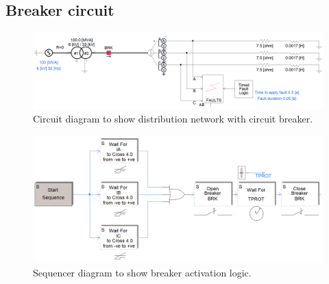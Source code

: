 \subsection{Breaker circuit}
\begin{figure}[H]
    \centering
    \includegraphics[width = \textwidth]{img/figure15.png}
    \caption{Circuit diagram to show distribution network with circuit breaker.}
    \label{fig:breakerNetwork}
\end{figure}
\begin{figure}[H]
    \centering
    \includegraphics[width = \textwidth]{img/figure16.png}
    \caption{Sequencer diagram to show breaker activation logic.}
    \label{fig:sequencer}
\end{figure}